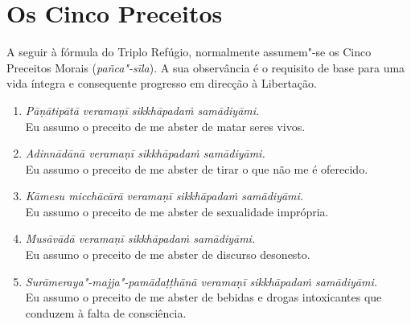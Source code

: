 \section{Os Cinco Preceitos}

A seguir à fórmula do Triplo Refúgio, normalmente assumem"-se os Cinco Preceitos
Morais (\emph{pañca"-sīla}). A sua observância é o requisito de base para uma
vida íntegra e consequente progresso em direcção à Libertação.

\begin{enumerate}
  \item \emph{Pāṇātipātā veramaṇī sikkhāpadaṁ samādiyāmi.}\\
        Eu assumo o preceito de me abster de matar seres vivos.

  \item \emph{Adinnādānā veramaṇī sikkhāpadaṁ samādiyāmi.}\\
        Eu assumo o preceito de me abster de tirar o que não me é oferecido.

  \item \emph{Kāmesu micchācārā veramaṇī sikkhāpadaṁ samādiyāmi.}\\
        Eu assumo o preceito de me abster de sexualidade imprópria.

  \item \emph{Musāvādā veramaṇī sikkhāpadaṁ samādiyāmi.}\\
        Eu assumo o preceito de me abster de discurso desonesto.

  \item \emph{Surāmeraya"-majja"-pamādaṭṭhānā veramaṇī sikkhāpadaṁ samādiyāmi.}\\
        Eu assumo o preceito de me abster de bebidas e drogas intoxicantes que
        conduzem à falta de consciência.
\end{enumerate}
